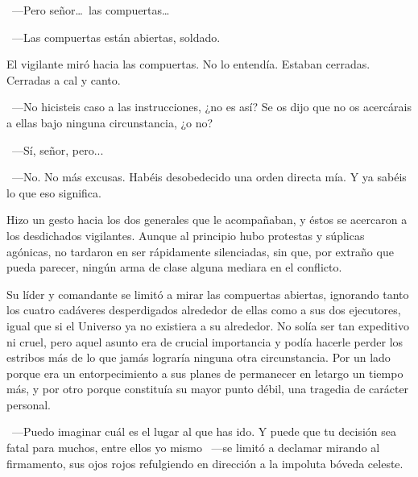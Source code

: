 ~---Pero señor\dots\ las compuertas\dots

~---Las compuertas están abiertas, soldado.

El vigilante miró hacia las compuertas. No lo entendía. Estaban cerradas. Cerradas a cal y canto.

~---No hicisteis caso a las instrucciones, ¿no es así? Se os dijo que no os acercárais a ellas bajo ninguna circunstancia, ¿o no?

~---Sí, señor, pero...

~---No. No más excusas. Habéis desobedecido una orden directa mía. Y ya sabéis lo que eso significa.

Hizo un gesto hacia los dos generales que le acompañaban, y éstos se acercaron a los desdichados vigilantes. Aunque al principio hubo protestas y súplicas agónicas, no tardaron en ser rápidamente silenciadas, sin que, por extraño que pueda parecer, ningún arma de clase alguna mediara en el conflicto.

Su líder y comandante se limitó a mirar las compuertas abiertas, ignorando tanto los cuatro cadáveres desperdigados alrededor de ellas como a sus dos ejecutores, igual que si el Universo ya no existiera a su alrededor. No solía ser tan expeditivo ni cruel, pero aquel asunto era de crucial importancia y podía hacerle perder los estribos más de lo que jamás lograría ninguna otra circunstancia. Por un lado porque era un entorpecimiento a sus planes de permanecer en letargo un tiempo más, y por otro porque constituía su mayor punto débil, una tragedia de carácter personal.

~---Puedo imaginar cuál es el lugar al que has ido. Y puede que tu decisión sea fatal para muchos, entre ellos yo mismo ~---se limitó a declamar mirando al firmamento, sus ojos rojos refulgiendo en dirección a la impoluta bóveda celeste.

